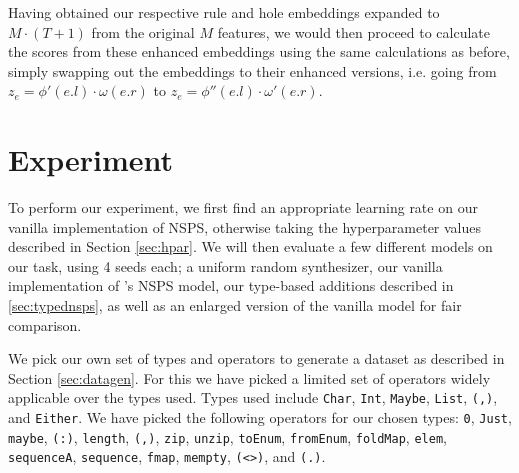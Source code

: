\documentclass{article} %
\begin{document}
Having obtained our respective rule and hole embeddings expanded to $M \cdot (T+1)$ from the original $M$ features,
we would then proceed to calculate the scores from these enhanced embeddings using the same calculations as before,
simply swapping out the embeddings to their enhanced versions,
i.e. going from $z_e = \phi'(e.l) \cdot \omega(e.r)$ to $z_e = \phi''(e.l) \cdot \omega'(e.r)$.



\section{Experiment} \label{sec:experiment}

To perform our experiment, we first find an appropriate learning rate on our vanilla implementation of NSPS,
otherwise taking the hyperparameter values described in Section \ref{sec:hpar}.
% 
We will then evaluate a few different models on our task, using 4 seeds each;
a uniform random synthesizer,
our vanilla implementation of \citet{nsps}'s NSPS model,
our type-based additions described in \ref{sec:typednsps},
as well as an enlarged version of the vanilla model for fair comparison.


We pick our own set of types and operators to generate a dataset as described in Section \ref{sec:datagen}.
For this we have picked a limited set of operators widely applicable over the types used.
Types used include \verb|Char|, \verb|Int|, \verb|Maybe|, \verb|List|, \verb|(,)|, and \verb|Either|.
%
We have picked the following operators for our chosen types:
\verb|0|, %
\verb|Just|, %
\verb|maybe|, %
\verb|(:)|, %
\verb|length|, %
\verb|(,)|, %
\verb|zip|, %
\verb|unzip|, %
\verb|toEnum|, %
\verb|fromEnum|, %
\verb|foldMap|, %
\verb|elem|, %
\verb|sequenceA|, %
\verb|sequence|, %
\verb|fmap|, %
\verb|mempty|, %
\verb|(<>)|, %
%
and \verb|(.)|.
\end{document}
